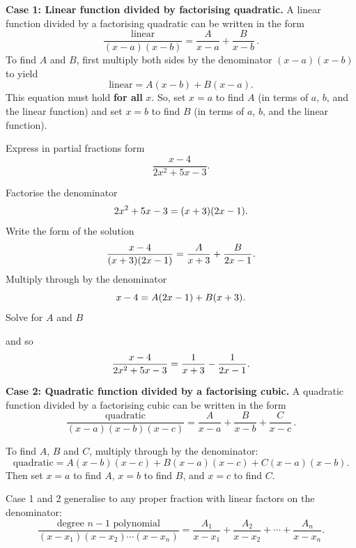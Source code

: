 \textbf{Case 1: Linear function divided by factorising quadratic.} A linear function divided by a factorising quadratic can be written in the form
\begin{equation*}
\frac{\text{linear}}{(x-a)(x-b)}=\frac{A}{x-a}+\frac{B}{x-b}\, .    
\end{equation*}
To find $A$ and $B$, first multiply both sides by the denominator $(x-a)(x-b)$ to yield
\[
\text{linear}=A(x-b)+B(x-a).
\]
This equation must hold \textbf{for all} $x$. So, set $x=a$ to find $A$ (in terms of $a$, $b$, and the linear function) and set $x=b$ to find $B$ (in terms of $a$, $b$, and the linear function).

\goodbreak 
\begin{example}[Lecture]
Express in partial fractions form
\[
\frac{x-4}{2x^2+5x-3}.
\]
\end{example}
%
\begin{solution}
Factorise the denominator
\[
2x^2+5x-3=(x+3)(2x-1).
\]
Write the form of the solution
\[
\frac{x-4}{(x+3)(2x-1)}=\frac{A}{x+3}+\frac{B}{2x-1}.
\]
Multiply through by the denominator
\[
x-4=A(2x-1)+B(x+3).
\]
Solve for $A$ and $B$\par
{}\par
{}\par
and so
\[
\frac{x-4}{2x^2+5x-3}=\frac{1}{x+3}-\frac{1}{2x-1}.
\]
\end{solution}

\textbf{Case 2: Quadratic function divided by a factorising cubic.} A quadratic function divided by a factorising cubic can be written in the form
\begin{equation*}
    \frac{\text{quadratic}}{(x-a)(x-b)(x-c)}=\frac{A}{x-a}+\frac{B}{x-b}+\frac{C}{x-c} \, .
\end{equation*}

To find $A$, $B$ and $C$, multiply through by the denominator:
\[
\text{quadratic}=A(x-b)(x-c)+B(x-a)(x-c)+C(x-a)(x-b).
\]
Then set $x=a$ to find $A$, $x=b$ to find $B$, and $x=c$ to find $C$.

Case 1 and 2 generalise to any proper fraction with linear factors on the denominator:
\begin{equation}
\frac{\text{degree }n-1\text{ polynomial}}{(x-x_1)(x-x_2)\cdots(x-x_n)}
=
\frac{A_1}{x-x_1}+\frac{A_2}{x-x_2}+\cdots+\frac{A_n}{x-x_n}.
\end{equation}


